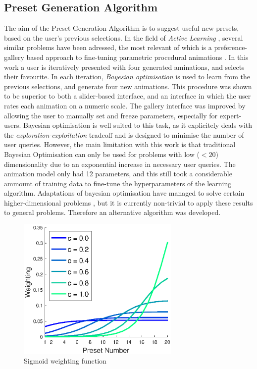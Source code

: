 \documentclass[11pt, oneside]{report}   	%
\begin{document}
\subsection{Preset Generation Algorithm} \label{sec:PresetGeneration}
The aim of the Preset Generation Algorithm is to suggest useful new presets, based on the user's previous selections. In the field of \emph{Active Learning} \cite{ActiveLearning}, several similar problems have been adressed, the most relevant of which is a preference-gallery based approach to fine-tuning parametric procedural animations \cite{PreferenceGallery}.
In this work a user is iteratively presented with four generated aminations, and selects their favourite. In each iteration, \emph{Bayesian optimisation} is used to learn from the previous selections, and generate four new animations. This procedure was shown to be superior to both a slider-based interface, and an interface in which the user rates each animation on a numeric scale. The gallery interface was improved by allowing the user to manually set and freeze parameters, especially for expert-users. Bayesian optimisation is well suited to this task, as it explicitely deals with the \emph{exploration-exploitation} tradeoff \cite{ExplorationExploitation} and is designed to minimise the number of user queries. However, the main limitation with this work is that traditional Bayesian Optimisation can only be used for problems with low ($<20$) dimensionality due to an exponential increase in necessary user queries. The animation model only had 12 parameters, and this still took a considerable ammount of training data to fine-tune the hyperparameters of the learning algorithm.  Adaptations of bayesian optimisation have managed to solve certain higher-dimensional problems \cite{BayesOptDimensionality}, but it is currently non-trivial to apply these results to general problems. Therefore an alternative algorithm was developed.
\begin{figure}
	\vspace{-30pt}
	\hspace{-31pt}
	\includegraphics[width = 3.1in]{SigmoidWeights.eps}
	\caption{Sigmoid weighting function}
	\label{fig:SigmoidWeights}
	
	
	\vspace{40pt}
\end{figure}
\end{document}
